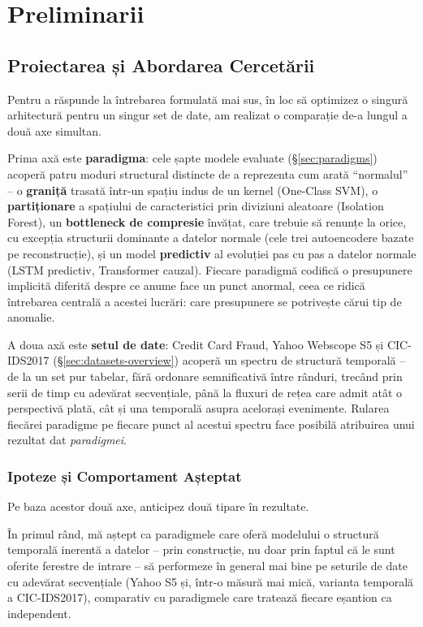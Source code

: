 \chapter{Preliminarii}
\label{ch:preliminarii}

\section{Proiectarea și Abordarea Cercetării}
\label{sec:two-axes}

Pentru a răspunde la întrebarea formulată mai sus, în loc să optimizez o singură arhitectură pentru un singur set de date, am realizat o comparație de-a lungul a două axe simultan.

Prima axă este \textbf{paradigma}: cele șapte modele evaluate (\S\ref{sec:paradigms}) acoperă patru moduri structural distincte de a reprezenta cum arată \enquote{normalul} -- o \textbf{graniță} trasată într-un spațiu indus de un kernel (One-Class SVM), o \textbf{partiționare} a spațiului de caracteristici prin diviziuni aleatoare (Isolation Forest), un \textbf{bottleneck de compresie} învățat, care trebuie să renunțe la orice, cu excepția structurii dominante a datelor normale (cele trei autoencodere bazate pe reconstrucție), și un model \textbf{predictiv} al evoluției pas cu pas a datelor normale (LSTM predictiv, Transformer cauzal). Fiecare paradigmă codifică o presupunere implicită diferită despre ce anume face un punct anormal, ceea ce ridică întrebarea centrală a acestei lucrări: care presupunere se potrivește cărui tip de anomalie.

A doua axă este \textbf{setul de date}: Credit Card Fraud, Yahoo Webscope S5 și CIC-IDS2017 (\S\ref{sec:datasets-overview}) acoperă un spectru de structură temporală -- de la un set pur tabelar, fără ordonare semnificativă între rânduri, trecând prin serii de timp cu adevărat secvențiale, până la fluxuri de rețea care admit atât o perspectivă plată, cât și una temporală asupra acelorași evenimente. Rularea fiecărei paradigme pe fiecare punct al acestui spectru face posibilă atribuirea unui rezultat dat \emph{paradigmei}.

\subsection{Ipoteze și Comportament Așteptat}
\label{sec:expected-behaviour}

Pe baza acestor două axe, anticipez două tipare în rezultate.

În primul rând, mă aștept ca paradigmele care oferă modelului o structură temporală inerentă a datelor -- prin construcție, nu doar prin faptul că le sunt oferite ferestre de intrare -- să performeze în general mai bine pe seturile de date cu adevărat secvențiale (Yahoo S5 și, într-o măsură mai mică, varianta temporală a CIC-IDS2017), comparativ cu paradigmele care tratează fiecare eșantion ca independent.

